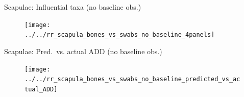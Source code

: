 \documentclass{beamer}
\begin{document}
\begin{frame}{Scapulae: Influential taxa (no baseline obs.)}

  \begin{center}
    \begin{figure}
      \texttt{[image: ../../rr\_scapula\_bones\_vs\_swabs\_no\_baseline\_4panels]}
    \end{figure}
  \end{center}

\end{frame}


\begin{frame}{Scapulae: Pred.\ vs. actual ADD (no baseline obs.)}

  \begin{center}
    \begin{figure}
      \texttt{[image: ../../rr\_scapula\_bones\_vs\_swabs\_no\_baseline\_predicted\_vs\_actual\_ADD]}
    \end{figure}
  \end{center}

\end{frame}
\end{document}
